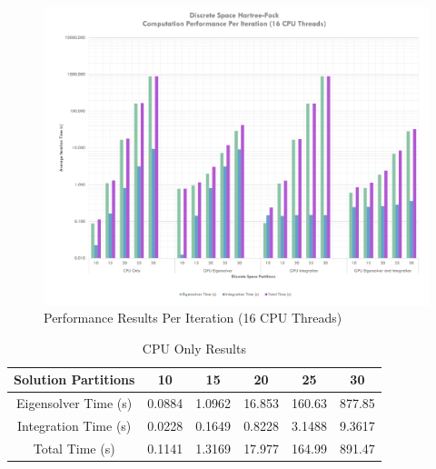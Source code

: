 \documentclass[conference, twoside]{IEEEtran}
\begin{document}
\begin{figure}[ht]
\centering
\includegraphics[width=7in]{figures/sixteen-core-results.pdf}
\caption{Performance Results Per Iteration (16 CPU Threads)}
\label{perf-results-per-iteration-sixteen-core}
\end{figure}


\begin{table}
    \renewcommand{\arraystretch}{1.3} %
    \caption{CPU Only Results}
    \label{cpu-only-results}
    \centering
    \begin{tabular}{c||c|c|c|c|c}
        \hline
        {Solution Partitions} & {10} & {15} & {20} & {25} & {30} \\
        \hline
        \hline
        {Eigensolver Time (s)}              & {0.0884} & {1.0962} & {16.853} & {160.63} & {877.85}\\
        {Integration Time (s)}              & {0.0228} & {0.1649} & {0.8228} & {3.1488} & {9.3617}\\
        {Total Time (s)}                    & {0.1141} & {1.3169} & {17.977} & {164.99} & {891.47}\\
        \hline
    \end{tabular}
\end{table}
\end{document}
